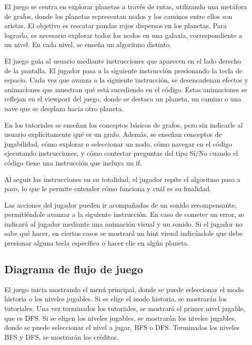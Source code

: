 El juego se centra en explorar planetas a través de rutas, utilizando una metáfora de grafos, donde los planetas representan nodos y los caminos entre ellos son aristas. El objetivo es rescatar pandas rojos dispersos en los planetas. Para lograrlo, es necesario explorar todos los nodos en una galaxia, correspondiente a un nivel. En cada nivel, se enseña un algoritmo distinto.

El juego guía al usuario mediante instrucciones que aparecen en el lado derecho de la pantalla. El jugador pasa a la siguiente instrucción presionando la tecla de espacio. Cada vez que avanza a la siguiente instrucción, se desencadenan efectos y animaciones que muestran qué está sucediendo en el código. Estas animaciones se reflejan en el viewport del juego, donde se destaca un planeta, un camino o una nave que se desplaza hacia otro planeta.

En los tutoriales se enseñan los conceptos básicos de grafos, pero sin indicarle al usuario explícitamente qué es un grafo. Además, se enseñan conceptos de jugabilidad, cómo explorar o seleccionar un nodo, cómo navegar en el código ejecutando instrucciones, y cómo contestar preguntas del tipo Sí/No cuando el código tiene una instrucción que incluya un if.

Al seguir las instrucciones en su totalidad, el jugador repite el algoritmo paso a paso, lo que le permite entender cómo funciona y cuál es su finalidad.

Las acciones del jugador pueden ir acompañadas de un sonido recompensante, permitiéndole avanzar a la siguiente instrucción. En caso de cometer un error, se indicará al jugador mediante una animación visual y un sonido. Si el jugador no sabe qué hacer, en ciertos casos se mostrará un hint visual indicándole que debe presionar alguna tecla específica o hacer clic en algún planeta.


\subsection{Diagrama de flujo de juego}

El juego inicia mostrando el menú principal, donde se puede seleccionar el modo historia o los niveles jugables. Si se elige el modo historia, se mostrarán los tutoriales. Una vez terminados los tutoriales, se mostrará el primer nivel jugable, que es DFS. Si se eligen los niveles jugables, se mostrarán los niveles jugables, donde se puede seleccionar el nivel a jugar, BFS o DFS.
Terminados los niveles BFS y DFS, se mostrarán los créditos.

